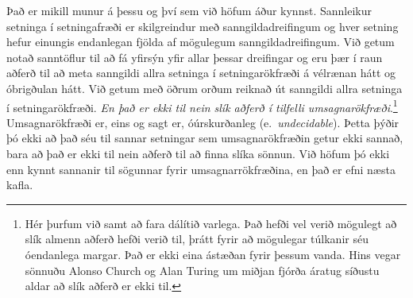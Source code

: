 Það er mikill munur á þessu og því sem við höfum áður kynnst. Sannleikur setninga í setningafræði er skilgreindur með sanngildadreifingum og hver setning hefur einungis endanlegan fjölda af mögulegum sanngildadreifingum. Við getum notað sanntöflur til að fá yfirsýn yfir allar þessar dreifingar og eru þær í raun aðferð til að meta sanngildi allra setninga í setningarökfræði á vélrænan hátt og óbrigðulan hátt. Við getum með öðrum orðum reiknað út sanngildi allra setninga í setningarökfræði. \emph{En það er ekki til nein slík aðferð í tilfelli umsagnarökfræði}.\footnote{Hér þurfum við samt að fara dálítið varlega. Það hefði vel verið mögulegt að slík almenn aðferð hefði verið til, þrátt fyrir að mögulegar túlkanir séu óendanlega margar. Það er ekki eina ástæðan fyrir þessum vanda. Hins vegar sönnuðu Alonso Church og Alan Turing um miðjan fjórða áratug síðustu aldar að slík aðferð er ekki til.} Umsagnarökfræði er, eins og sagt er, óúrskurðanleg (e.\ \emph{undecidable}). Þetta þýðir þó ekki að það séu til sannar setningar sem umsagnarökfræðin getur ekki sannað, bara að það er ekki til nein aðferð til að finna slíka sönnun. Við höfum þó ekki enn kynnt sannanir til sögunnar fyrir umsagnarrökfræðina, en það er efni næsta kafla.